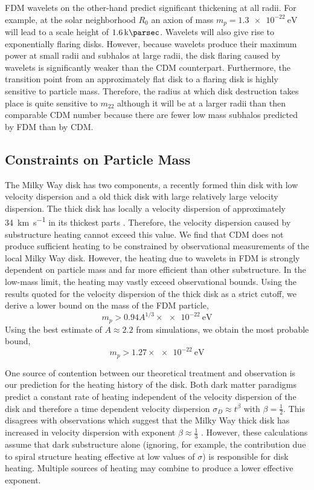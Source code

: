 \documentclass[usenatbib]{mnras}
\begin{document}
\par
FDM wavelets on the other-hand predict significant thickening at all radii. For example, at the solar neighborhood $R_0$ an axion of mass $m_p = \SI{1.3 e-22}{\electronvolt}$ will lead to a scale height of $\SI{1.6}{ \kilo\parsec}$. Wavelets will also give rise to exponentially flaring disks. However, because wavelets produce their maximum power at small radii and subhalos at large radii, the disk flaring caused by wavelets is significantly weaker than the CDM counterpart. Furthermore, the transition point from an approximately flat disk to a flaring disk is highly sensitive to particle mass. Therefore, the radius at which disk destruction takes place is quite sensitive to $m_{22}$ although it will be at a larger radii than then comparable CDM number because there are fewer low mass subhalos predicted by FDM than by CDM. 


\subsection{Constraints on Particle Mass}

The Milky Way disk has two components, a recently formed thin disk with low velocity dispersion and a old thick disk with large relatively large velocity dispersion. The thick disk has locally a velocity dispersion of approximately \SI{34}{\kilo\meter\per\second} in its thickest parts \citep{milky_way}. Therefore, the velocity dispersion caused by substructure heating cannot exceed this value. We find that CDM does not produce sufficient heating to be constrained by observational measurements of the local  Milky Way disk. However, the heating due to wavelets in FDM is strongly dependent on particle mass and far more efficient than other substructure. In the low-mass limit, the heating may vastly exceed observational bounds. Using the results quoted for the velocity dispersion of the thick disk as a strict cutoff, we derive a lower bound on the mass of the FDM particle,
\begin{equation}
m_p > 0.94 A^{1/3} \times \SI{e-22}{\electronvolt}
\end{equation}
Using the best estimate of $A \approx 2.2$ from simulations, we obtain the most probable bound,
\[ m_p > 1.27 \times \SI{e-22}{\electronvolt} \]
\par
One source of contention between our theoretical treatment and observation is our prediction for the heating history of the disk. Both dark matter paradigms predict a constant rate of heating independent of the velocity dispersion of the disk and therefore a time dependent velocity dispersion $\sigma_D \approx t^{\beta}$ with $\beta = \tfrac{1}{2}$. This disagrees with observations which suggest that the Milky Way thick disk has increased in velocity dispersion with exponent $\beta \approx \tfrac{1}{3}$ \citep{heating_history}. However, these calculations assume that dark substructure alone (ignoring, for example, the contribution due to spiral structure heating effective at low values of $\sigma$) is responsible for disk heating. Multiple sources of heating may combine to produce a lower effective exponent. 
\end{document}
